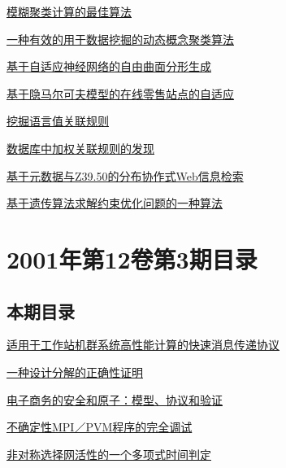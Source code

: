 \documentclass[a4paper]{article}
\begin{document}
\href{http://www.jos.org.cn/ch/reader/download_pdf.aspx?file_no=20010413&year_id=2001&quarter_id=4&falg=1}{模糊聚类计算的最佳算法}

\href{http://www.jos.org.cn/ch/reader/download_pdf.aspx?file_no=20010414&year_id=2001&quarter_id=4&falg=1}{一种有效的用于数据挖掘的动态概念聚类算法}

\href{http://www.jos.org.cn/ch/reader/download_pdf.aspx?file_no=20010415&year_id=2001&quarter_id=4&falg=1}{基于自适应神经网络的自由曲面分形生成}

\href{http://www.jos.org.cn/ch/reader/download_pdf.aspx?file_no=20010416&year_id=2001&quarter_id=4&falg=1}{基于隐马尔可夫模型的在线零售站点的自适应}

\href{http://www.jos.org.cn/ch/reader/download_pdf.aspx?file_no=20010417&year_id=2001&quarter_id=4&falg=1}{挖掘语言值关联规则}

\href{http://www.jos.org.cn/ch/reader/download_pdf.aspx?file_no=20010418&year_id=2001&quarter_id=4&falg=1}{数据库中加权关联规则的发现}

\href{http://www.jos.org.cn/ch/reader/download_pdf.aspx?file_no=20010419&year_id=2001&quarter_id=4&falg=1}{基于元数据与Z39.50的分布协作式Web信息检索}

\href{http://www.jos.org.cn/ch/reader/download_pdf.aspx?file_no=20010420&year_id=2001&quarter_id=4&falg=1}{基于遗传算法求解约束优化问题的一种算法}


\section{\textbf{2001年第12卷第3期目录}}
\subsection{本期目录}
\href{http://www.jos.org.cn/ch/reader/download_pdf.aspx?file_no=20010301&year_id=2001&quarter_id=3&falg=1}{适用于工作站机群系统高性能计算的快速消息传递协议}

\href{http://www.jos.org.cn/ch/reader/download_pdf.aspx?file_no=20010302&year_id=2001&quarter_id=3&falg=1}{一种设计分解的正确性证明}

\href{http://www.jos.org.cn/ch/reader/download_pdf.aspx?file_no=20010303&year_id=2001&quarter_id=3&falg=1}{电子商务的安全和原子：模型、协议和验证}

\href{http://www.jos.org.cn/ch/reader/download_pdf.aspx?file_no=20010304&year_id=2001&quarter_id=3&falg=1}{不确定性MPI／PVM程序的完全调试}

\href{http://www.jos.org.cn/ch/reader/download_pdf.aspx?file_no=20010305&year_id=2001&quarter_id=3&falg=1}{非对称选择网活性的一个多项式时间判定}
\end{document}
